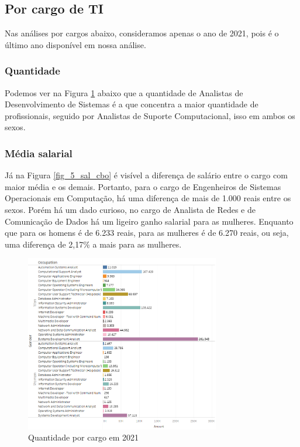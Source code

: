 \subsection{Por cargo de TI}

Nas análises por cargos abaixo, consideramos apenas o ano de 2021, pois é o último ano disponível em nossa análise.

\subsubsection{Quantidade}

Podemos ver na Figura \ref{fig_5_qnt_cbo} abaixo que a quantidade de Analistas de Desenvolvimento de Sistemas é a que concentra a maior quantidade de profissionais, seguido por Analistas de Suporte Computacional, isso em ambos os sexos. 

\subsubsection{Média salarial}

Já na Figura \ref{fig_5_sal_cbo} é visível a diferença de salário entre o cargo com maior média e os demais. Portanto, para o cargo de Engenheiros de Sistemas Operacionais em Computação, há uma diferença de mais de 1.000 reais entre os sexos. Porém há um dado curioso, no cargo de Analista de Redes e de Comunicação de Dados há um ligeiro ganho salarial para as mulheres. Enquanto que para os homens é de 6.233 reais, para as mulheres é de 6.270 reais, ou seja, uma diferença de 2,17\% a mais para as mulheres.

\begin{figure}[htbp]
	\centerline{
		\includegraphics[width=85mm]{assets/5_qnt_cbo.PNG}
	}
	\caption{Quantidade por cargo em 2021}
	\label{fig_5_qnt_cbo}
\end{figure}

